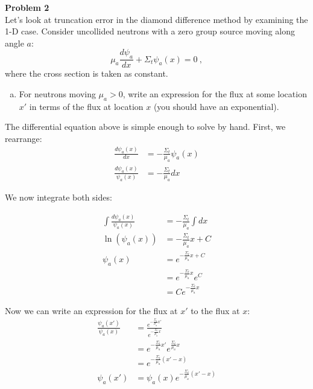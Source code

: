 \documentclass[10pt]{article}
\begin{document}
\newpage
\noindent \textbf{Problem 2}\\
Let's look at truncation error in the diamond difference method by examining the 1-D case. Consider uncollided neutrons with a zero group source moving along angle $a$:
%
\begin{equation*}
\mu_a \frac{d \psi_a}{dx} + \Sigma_t \psi_a(x) = 0\:,
\end{equation*}
where the cross section is taken as constant.

\begin{enumerate}[(a)]
\item For neutrons moving $\mu_a > 0$, write an expression for the flux at some location $x'$ in terms of the flux at location $x$ (you should have an exponential).
\end{enumerate}

The differential equation above is simple enough to solve by hand. First, we rearrange:
%
\begin{align*}
    \frac{d\psi_a(x)}{dx} &= -\frac{\Sigma_t}{\mu_a } \psi_a(x) \\
    \frac{d\psi_a(x)}{\psi_a(x)} &= -\frac{\Sigma_t}{\mu_a } dx
\end{align*}

We now integrate both sides:

\begin{align*}
    \int \frac{d\psi_a(x)}{\psi_a(x)} &= -\frac{\Sigma_t}{\mu_a } \int dx \\
    \ln(\psi_a(x)) &= -\frac{\Sigma_t}{\mu_a }x + C \\
    \psi_a(x) &= e^{-\frac{\Sigma_t}{\mu_a }x + C} \\
    &= e^{-\frac{\Sigma_t}{\mu_a }x}e^C \\
    &= Ce^{-\frac{\Sigma_t}{\mu_a }x}
\end{align*}

Now we can write an expression for the flux at $x'$ to the flux at $x$:
%
\begin{align*}
    \frac{\psi_a(x')}{\psi_a(x)} &= \frac{e^{-\frac{\Sigma_t}{\mu_a }x'}}{e^{-\frac{\Sigma_t}{\mu_a }x}} \\
    &= e^{-\frac{\Sigma_t}{\mu_a }x'} e^{\frac{\Sigma_t}{\mu_a }x} \\
    &= e^{-\frac{\Sigma_t}{\mu_a }(x' - x)} \\
    \psi_a(x') &= \psi_a(x)e^{-\frac{\Sigma_t}{\mu_a }(x' - x)}
\end{align*}
\end{document}
